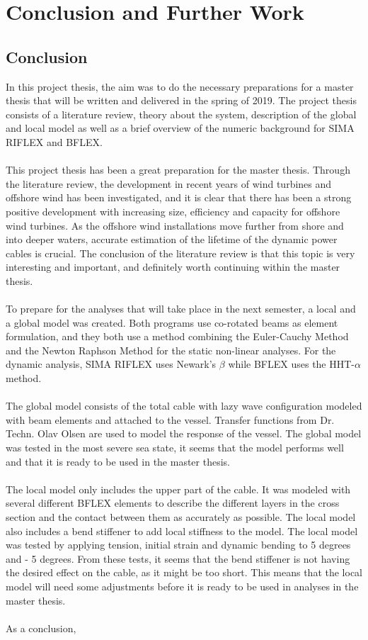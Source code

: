 \chapter{Conclusion and Further Work}
\label{chap:conclusion}
\section{Conclusion}
In this project thesis, the aim was to do the necessary preparations for a master thesis that will be written and delivered in the spring of 2019. The project thesis consists of a literature review, theory about the system, description of the global and local model as well as a brief overview of the numeric background for SIMA RIFLEX and BFLEX.\\\\ This project thesis has been a great preparation for the master thesis. Through the literature review, the development in recent years of wind turbines and offshore wind has been investigated, and it is clear that there has been a strong positive development with increasing size, efficiency and capacity for offshore wind turbines. As the offshore wind installations move further from shore and into deeper waters, accurate estimation of the lifetime of the dynamic power cables is crucial. The conclusion of the literature review is that this topic is very interesting and important, and definitely worth continuing within the master thesis. \\\\ To prepare for the analyses that will take place in the next semester, a local and a global model was created. Both programs use co-rotated beams as element formulation, and they both use a method combining the Euler-Cauchy Method and the Newton Raphson Method for the static non-linear analyses. For the dynamic analysis, SIMA RIFLEX uses Newark's $\beta$ while BFLEX uses the HHT-$\alpha$ method. \\\\ The global model consists of the total cable with lazy wave configuration modeled with beam elements and attached to the vessel. Transfer functions from Dr. Techn. Olav Olsen are used to model the response of the vessel. The global model was tested in the most severe sea state, it seems that the model performs well and that it is ready to be used in the master thesis.  \\\\The local model only includes the upper part of the cable. It was modeled with several different BFLEX elements to describe the different layers in the cross section and the contact between them as accurately as possible. The local model also includes a bend stiffener to add local stiffness to the model. The local model was tested by applying tension, initial strain and dynamic bending to 5 degrees and - 5 degrees. From these tests, it seems that the bend stiffener is not having the desired effect on the cable, as it might be too short. This means that the local model will need some adjustments before it is ready to be used in analyses in the master thesis.  \\\\ As a conclusion, 